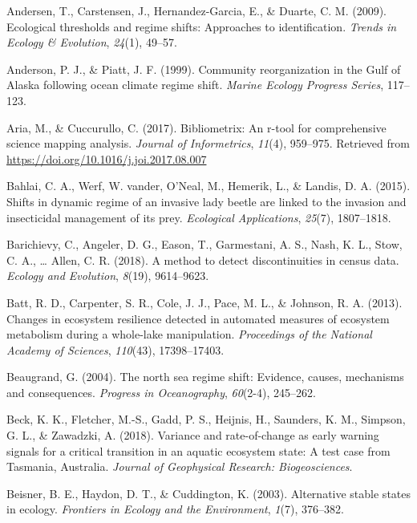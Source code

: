 \documentclass[12pt,twoside,openany]{reedthesis}
\begin{document}
\leavevmode\hypertarget{ref-andersen_ecological_2009}{}%
Andersen, T., Carstensen, J., Hernandez-Garcia, E., \& Duarte, C. M. (2009). Ecological thresholds and regime shifts: Approaches to identification. \emph{Trends in Ecology \& Evolution}, \emph{24}(1), 49--57.

\leavevmode\hypertarget{ref-anderson_community_1999}{}%
Anderson, P. J., \& Piatt, J. F. (1999). Community reorganization in the Gulf of Alaska following ocean climate regime shift. \emph{Marine Ecology Progress Series}, 117--123.

\leavevmode\hypertarget{ref-bibliometrix}{}%
Aria, M., \& Cuccurullo, C. (2017). Bibliometrix: An r-tool for comprehensive science mapping analysis. \emph{Journal of Informetrics}, \emph{11}(4), 959--975. Retrieved from \url{https://doi.org/10.1016/j.joi.2017.08.007}

\leavevmode\hypertarget{ref-bahlai2015shifts}{}%
Bahlai, C. A., Werf, W. vander, O'Neal, M., Hemerik, L., \& Landis, D. A. (2015). Shifts in dynamic regime of an invasive lady beetle are linked to the invasion and insecticidal management of its prey. \emph{Ecological Applications}, \emph{25}(7), 1807--1818.

\leavevmode\hypertarget{ref-barichievy2018method}{}%
Barichievy, C., Angeler, D. G., Eason, T., Garmestani, A. S., Nash, K. L., Stow, C. A., \ldots{} Allen, C. R. (2018). A method to detect discontinuities in census data. \emph{Ecology and Evolution}, \emph{8}(19), 9614--9623.

\leavevmode\hypertarget{ref-batt2013changes}{}%
Batt, R. D., Carpenter, S. R., Cole, J. J., Pace, M. L., \& Johnson, R. A. (2013). Changes in ecosystem resilience detected in automated measures of ecosystem metabolism during a whole-lake manipulation. \emph{Proceedings of the National Academy of Sciences}, \emph{110}(43), 17398--17403.

\leavevmode\hypertarget{ref-beaugrand2004north}{}%
Beaugrand, G. (2004). The north sea regime shift: Evidence, causes, mechanisms and consequences. \emph{Progress in Oceanography}, \emph{60}(2-4), 245--262.

\leavevmode\hypertarget{ref-beck_variance_2018}{}%
Beck, K. K., Fletcher, M.-S., Gadd, P. S., Heijnis, H., Saunders, K. M., Simpson, G. L., \& Zawadzki, A. (2018). Variance and rate-of-change as early warning signals for a critical transition in an aquatic ecosystem state: A test case from Tasmania, Australia. \emph{Journal of Geophysical Research: Biogeosciences}.

\leavevmode\hypertarget{ref-beisner2003alternative}{}%
Beisner, B. E., Haydon, D. T., \& Cuddington, K. (2003). Alternative stable states in ecology. \emph{Frontiers in Ecology and the Environment}, \emph{1}(7), 376--382.
\end{document}
